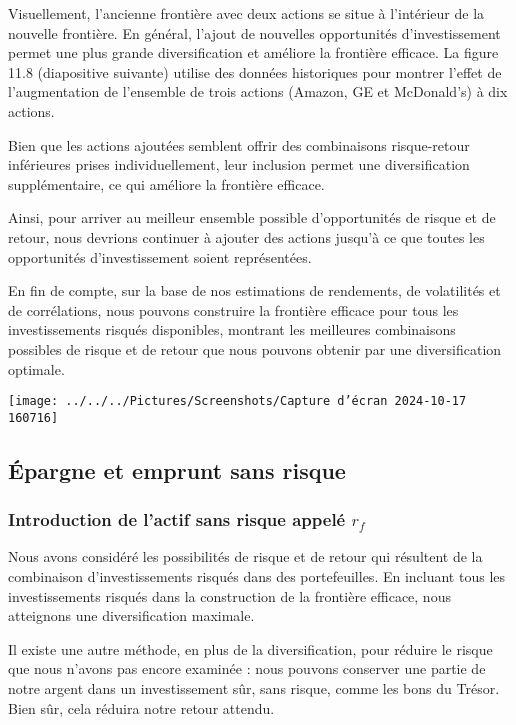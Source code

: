 \documentclass[a4paper, 12pt]{report}
\begin{document}
Visuellement, l'ancienne frontière avec deux actions se situe à l'intérieur de la nouvelle frontière. En général, l'ajout de nouvelles opportunités d'investissement permet une plus grande diversification et améliore la frontière efficace. La figure 11.8 (diapositive suivante) utilise des données historiques pour montrer l'effet de l'augmentation de l'ensemble de trois actions (Amazon, GE et McDonald's) à dix actions.

Bien que les actions ajoutées semblent offrir des combinaisons risque-retour inférieures prises individuellement, leur inclusion permet une diversification supplémentaire, ce qui améliore la frontière efficace.

Ainsi, pour arriver au meilleur ensemble possible d'opportunités de risque et de retour, nous devrions continuer à ajouter des actions jusqu'à ce que toutes les opportunités d'investissement soient représentées.

En fin de compte, sur la base de nos estimations de rendements, de volatilités et de corrélations, nous pouvons construire la frontière efficace pour tous les investissements risqués disponibles, montrant les meilleures combinaisons possibles de risque et de retour que nous pouvons obtenir par une diversification optimale.

\begin{center}
	\texttt{[image: ../../../Pictures/Screenshots/Capture d'écran 2024-10-17 160716]}
\end{center}

\subsection{Épargne et emprunt sans risque}

\subsubsection{Introduction de l'actif sans risque appelé \( r_f \)}

Nous avons considéré les possibilités de risque et de retour qui résultent de la combinaison d'investissements risqués dans des portefeuilles. En incluant tous les investissements risqués dans la construction de la frontière efficace, nous atteignons une diversification maximale.

Il existe une autre méthode, en plus de la diversification, pour réduire le risque que nous n'avons pas encore examinée : nous pouvons conserver une partie de notre argent dans un investissement sûr, sans risque, comme les bons du Trésor. Bien sûr, cela réduira notre retour attendu.
\end{document}
